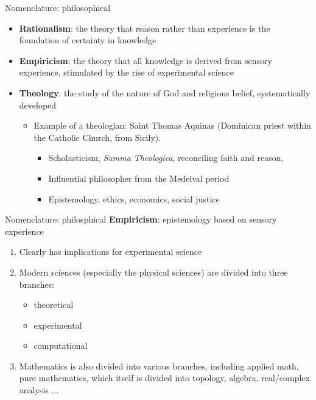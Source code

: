 \documentclass{beamer}
\begin{document}
\begin{frame}{Nomenclature: philosophical}
\small
\begin{itemize}
\item \textbf{Rationalism}: the theory that reason rather than experience is the foundation of certainty in knowledge
\item \textbf{Empiricism}: the theory that all knowledge is derived from sensory experience, stimulated by the rise of experimental science
\item \textbf{Theology}: the study of the nature of God and religious belief, systematically developed
\begin{itemize}
\item Example of a theologian: Saint Thomas Aquinas (Dominican priest within the Catholic Church, from Sicily).
\begin{itemize}
\item Scholasticism, \textit{Summa Theologica}, reconciling faith and reason, 
\item Influential philosopher from the Medeival period
\item Epistemology, ethics, economics, social justice
\end{itemize}
\end{itemize}
\end{itemize}
\end{frame}

\begin{frame}{Nomenclature: philosphical}
\textbf{Empiricism}: epistemology based on sensory experience
\begin{enumerate}
\item Clearly has implications for experimental science
\item Modern sciences (especially the physical sciences) are divided into three branches:
\begin{itemize}
\item theoretical
\item experimental
\item computational
\end{itemize}
\item Mathematics is also divided into various branches, including applied math, pure mathematics, which itself is divided into topology, algebra, real/complex analysis ...
\end{enumerate}
\end{frame}
\end{document}
